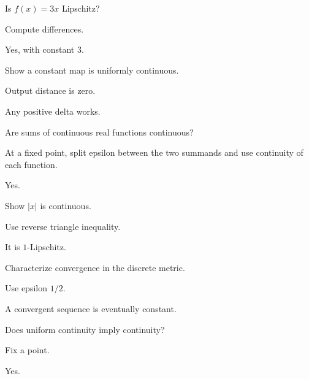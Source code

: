 \begin{exercise}\label{exr:ii05-02}
Is $f(x)=3x$ Lipschitz?
\end{exercise}
\begin{hint}
Compute differences.
\end{hint}
\begin{solution}
Yes, with constant $3$.
\end{solution}

\begin{exercise}\label{exr:ii05-03}
Show a constant map is uniformly continuous.
\end{exercise}
\begin{hint}
Output distance is zero.
\end{hint}
\begin{solution}
Any positive delta works.
\end{solution}

\begin{exercise}\label{exr:ii05-04}
Are sums of continuous real functions continuous?
\end{exercise}
\begin{hint}
At a fixed point, split epsilon between the two summands and use continuity of each function.
\end{hint}
\begin{solution}
Yes.
\end{solution}

\begin{exercise}\label{exr:ii05-05}
Show $|x|$ is continuous.
\end{exercise}
\begin{hint}
Use reverse triangle inequality.
\end{hint}
\begin{solution}
It is $1$-Lipschitz.
\end{solution}

\begin{exercise}\label{exr:ii05-06}
Characterize convergence in the discrete metric.
\end{exercise}
\begin{hint}
Use epsilon $1/2$.
\end{hint}
\begin{solution}
A convergent sequence is eventually constant.
\end{solution}

\begin{exercise}\label{exr:ii05-07}
Does uniform continuity imply continuity?
\end{exercise}
\begin{hint}
Fix a point.
\end{hint}
\begin{solution}
Yes.
\end{solution}

